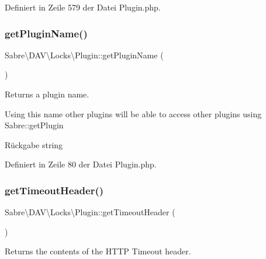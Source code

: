 Definiert in Zeile 579 der Datei Plugin.\+php.

\mbox{\label{class_sabre_1_1_d_a_v_1_1_locks_1_1_plugin_a1dfc87e58dc85f6262562fb026178238}} 
\subsubsection{\texorpdfstring{get\+Plugin\+Name()}{getPluginName()}}
{\footnotesize\ttfamily Sabre\textbackslash{}\+D\+A\+V\textbackslash{}\+Locks\textbackslash{}\+Plugin\+::get\+Plugin\+Name (\begin{DoxyParamCaption}{ }\end{DoxyParamCaption})}

Returns a plugin name.

Using this name other plugins will be able to access other plugins using Sabre\+::get\+Plugin

\begin{DoxyReturn}{Rückgabe}
string 
\end{DoxyReturn}


Definiert in Zeile 80 der Datei Plugin.\+php.

\mbox{\label{class_sabre_1_1_d_a_v_1_1_locks_1_1_plugin_a6f991c48301d5f0a2ccb446a63c8b8dd}} 
\subsubsection{\texorpdfstring{get\+Timeout\+Header()}{getTimeoutHeader()}}
{\footnotesize\ttfamily Sabre\textbackslash{}\+D\+A\+V\textbackslash{}\+Locks\textbackslash{}\+Plugin\+::get\+Timeout\+Header (\begin{DoxyParamCaption}{ }\end{DoxyParamCaption})}

Returns the contents of the H\+T\+TP Timeout header.

